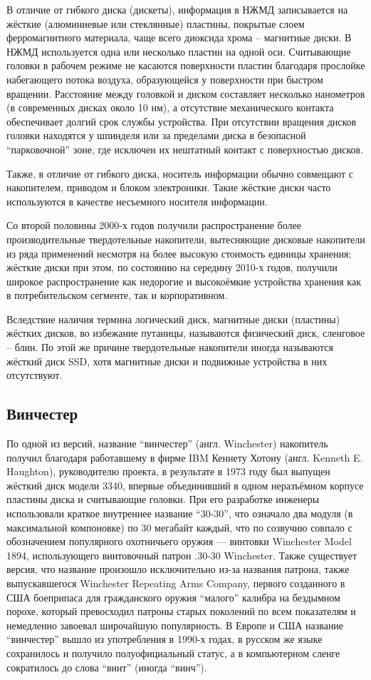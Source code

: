 \documentclass[bachelor, och, referat]{SCWorks}
\begin{document}
В отличие от гибкого диска (дискеты), информация в НЖМД записывается на жёсткие 
(алюминиевые или стеклянные) пластины, покрытые слоем ферромагнитного 
материала, чаще всего диоксида хрома -- магнитные диски. В НЖМД используется 
одна или несколько пластин на одной оси. Считывающие головки в рабочем режиме 
не касаются поверхности пластин благодаря прослойке набегающего потока воздуха, 
образующейся у поверхности при быстром вращении. Расстояние между головкой и 
диском составляет несколько нанометров (в современных дисках около 10 нм), а 
отсутствие механического контакта обеспечивает долгий срок службы устройства. 
При отсутствии вращения дисков головки находятся у шпинделя или за пределами 
диска в безопасной ``парковочной'' зоне, где исключен их нештатный контакт с 
поверхностью дисков. 

Также, в отличие от гибкого диска, носитель информации обычно совмещают с 
накопителем, приводом и блоком электроники. Такие жёсткие диски часто 
используются в качестве несъемного носителя информации.

Со второй половины 2000-х годов получили распространение более производительные 
твердотельные накопители, вытесняющие дисковые накопители из ряда применений 
несмотря на более высокую стоимость единицы хранения; жёсткие диски при этом, 
по состоянию на середину 2010-х годов, получили широкое распространение как 
недорогие и высокоёмкие устройства хранения как в потребительском сегменте, 
так и корпоративном.

Вследствие наличия термина логический диск, магнитные диски (пластины) жёстких 
дисков, во избежание путаницы, называются физический диск, сленговое -- блин. 
По этой же причине твердотельные накопители иногда называются жёсткий диск SSD, 
хотя магнитные диски и подвижные устройства в них отсутствуют.

\subsection{Винчестер}

По одной из версий, название ``винчестер'' (англ. Winchester) накопитель 
получил благодаря работавшему в фирме IBM Кеннету Хотону (англ. Kenneth E. 
Haughton), руководителю проекта, в результате в 1973 году был выпущен 
жёсткий диск модели 3340, впервые объединивший в одном неразъёмном 
корпусе пластины диска и считывающие головки. При его разработке инженеры 
использовали краткое внутреннее название ``30-30'', что означало два модуля 
(в максимальной компоновке) по 30 мегабайт каждый, что по созвучию совпало 
с обозначением популярного охотничьего оружия — винтовки Winchester Model 
1894, использующего винтовочный патрон .30-30 Winchester. Также существует 
версия, что название произошло исключительно из-за названия патрона, 
также выпускавшегося Winchester Repeating Arms Company, первого созданного 
в США боеприпаса для гражданского оружия ``малого'' калибра на бездымном порохе,
который превосходил патроны старых поколений по всем показателям и немедленно 
завоевал широчайшую популярность. В Европе и США название ``винчестер'' вышло 
из употребления в 1990-х годах, в русском же языке сохранилось и получило 
полуофициальный статус, а в компьютерном сленге сократилось до слова ``винт'' 
(иногда ``винч'').
\end{document}

